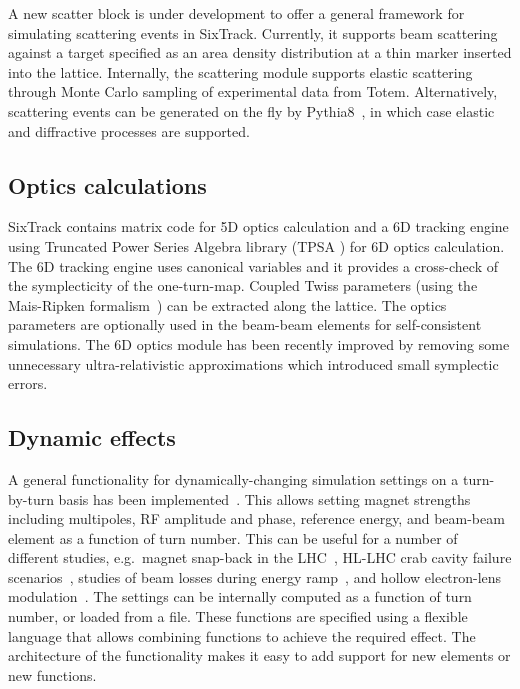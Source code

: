 \documentclass[a4paper,
              ]{jacow}
\begin{document}
A new scatter block is under development to offer a general framework for simulating scattering events in SixTrack. Currently, it supports beam scattering against a target specified as an area density distribution at a thin marker inserted into the lattice.
Internally, the scattering module supports elastic scattering through Monte Carlo sampling of experimental data from Totem. Alternatively, scattering events can be generated on the fly by Pythia8~\cite{pythia8}, in which case elastic and diffractive processes are supported.

\subsection{Optics calculations}

SixTrack contains matrix code for 5D optics calculation and a 6D tracking engine using Truncated Power Series Algebra library (TPSA \cite{tpsa}) for 6D optics calculation. The 6D tracking engine uses canonical variables and it provides a cross-check of the symplecticity of the one-turn-map. Coupled Twiss parameters (using the Mais-Ripken formalism~\cite{maisripken}) can be extracted along the lattice. The optics parameters are optionally used in the beam-beam elements for self-consistent simulations. The 6D optics module has been recently improved by removing some unnecessary ultra-relativistic approximations which introduced small symplectic errors.

\subsection{Dynamic effects}

A general functionality for dynamically-changing simulation settings on a turn-by-turn basis has been implemented~\cite{dynk,dynk2}. This allows setting magnet strengths including multipoles, RF amplitude and phase, reference energy, and beam-beam element as a function of turn number. This can be useful for a number of different studies, e.g.\  magnet snap-back in the LHC~\cite{snapback_lhc}, HL-LHC crab cavity failure scenarios~\cite{crabfail1,crabfail2,crabfail3}, studies of beam losses during energy ramp~\cite{modulation}, and hollow electron-lens modulation~\cite{elens-miriam}. The settings can be internally computed as a function of turn number, or loaded from a file. These functions are specified using a flexible language that  allows combining functions to achieve the required effect. The architecture of the functionality makes it easy to add support for new elements or new functions.
\end{document}
